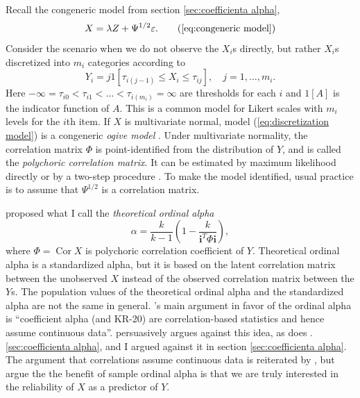 \documentclass[twoside]{article}
\DeclareMathOperator{\Cor}{Cor}
\begin{document}
Recall the congeneric model from section \ref{sec:coefficienta alpha},
\begin{equation}
X=\lambda Z+\Psi^{1/2}\varepsilon.    \tag{\ref{eq:congeneric model}}
\end{equation}
Consider the scenario when we do not observe the $X_{i}$s directly,
but rather $X_{i}$s discretized into $m_{i}$ categories according
to
\begin{equation}
Y_{i}=j1[\tau_{i(j-1)}\leq X_{i}\leq\tau_{ij}],\quad j = 1, \ldots,m_i. \label{eq:discretization model}
\end{equation}
Here $-\infty=\tau_{i0}<\tau_{i1}<\ldots<\tau_{i(m_{i})}=\infty$
are thresholds for each $i$ and $1[A]$ is the indicator function of $A$.
This is a common model for Likert scales with $m_{i}$ levels for
the $i$th item. If $X$ is multivariate normal, model (\ref{eq:discretization model})
is a congeneric \textit{ogive model} \citep{Swaminathan2016-rg}.
Under multivariate normality, the correlation matrix $\Phi$ is point-identified
from the distribution of $Y$, and is called the \textit{polychoric
correlation matrix}. It can be estimated by maximum likelihood directly
or by a two-step procedure \citep{Olsson1979-ti}. To make the model
identified, usual practice is to assume that $\Psi^{1/2}$ is a correlation
matrix. 

\citet{Zumbo2007-ap} proposed what I call the \textit{theoretical ordinal
alpha}
\begin{equation}
\alpha=\frac{k}{k-1}\left(1-\frac{k}{\mathbf{i}^{T}\Phi\mathbf{i}}\right), \label{eq:ordinal alpha}
\end{equation}
where $\Phi=\Cor X$ is polychoric correlation coefficient of $Y$.
Theoretical ordinal alpha is a standardized alpha, but it is based
on the latent correlation matrix between the unobserved $X$ instead
of the observed correlation matrix between the $Y$s. The population
values of the theoretical ordinal alpha and the standardized alpha
are not the same in general. \citet[p. 27]{Zumbo2007-ap}'s main argument
in favor of the ordinal alpha is \enquote{coefficient alpha (and KR-20)
are correlation-based statistics and hence assume continuous data}. \citet[p. 1060]{Chalmers2018-fj}
persuasively argues against this idea, as does \citet{Raykov2019-yr}. \ref{sec:coefficienta alpha}, and I argued against it in section \ref{sec:coefficienta alpha}. The argument that correlations assume continuous data is reiterated
by \citet{Gadermann2012-jl}, but \citet{Zumbo2019-lm} argue
the the benefit of sample ordinal alpha is that we are truly interested
in the reliability of $X$ as a predictor of $Y$.
\end{document}
